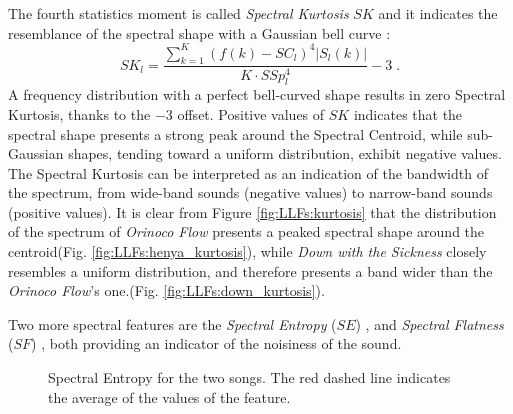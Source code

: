 The fourth statistics moment is called \textit{Spectral Kurtosis} $SK$ and it indicates the resemblance of the spectral shape with a Gaussian bell curve \cite{weihs2016music}:
\begin{equation}\label{eq:FSK}
SK_l = \frac{\sum\limits_{k=1}^{K} (f(k)-SC_l)^4 |S_l(k)| }{K \cdot SSp_l^4} -3 \; .
\end{equation}
A frequency distribution with a perfect bell-curved shape results in zero Spectral Kurtosis, thanks to the $-3$ offset. Positive values of $SK$ indicates that the spectral shape presents a strong peak around the Spectral Centroid, while sub-Gaussian shapes, tending toward a uniform distribution, exhibit negative values. The Spectral Kurtosis can be interpreted as an indication of the bandwidth of the spectrum, from wide-band sounds (negative values) to narrow-band sounds (positive values). It is clear from Figure \ref{fig:LLFs:kurtosis} that the distribution of the spectrum of \textit{Orinoco Flow} presents a peaked spectral shape around the centroid(Fig. \ref{fig:LLFs:henya_kurtosis}), while \textit{Down with the Sickness} closely resembles a uniform distribution, and therefore presents a band wider than the \textit{Orinoco Flow}'s one.(Fig. \ref{fig:LLFs:down_kurtosis}).


Two more spectral features are the \textit{Spectral Entropy} ($SE$) \cite{Lartillot2007}, and \textit{Spectral Flatness} ($SF$) \cite{Kim2005}, both providing an indicator of the noisiness of the sound.

\begin{figure}[tb]
	\centering
	 \hfil
	\caption{Spectral Entropy for the two songs. The red dashed line indicates the average of the values of the feature.}
	\label{fig:LLFs:entropy}          
\end{figure}


